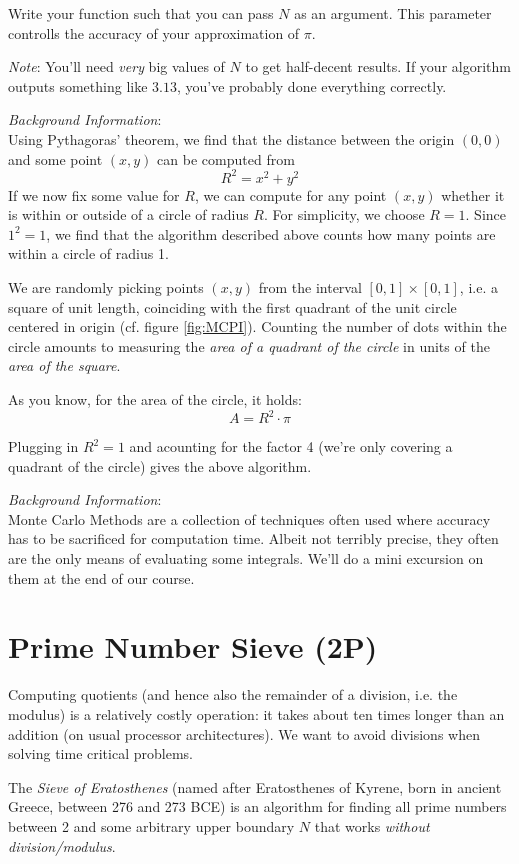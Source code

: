 \documentclass[
	english,
	fontsize=10pt,
	parskip=half,
	titlepage=true,
	DIV=12
]{scrartcl}
\newcommand*{\ie}{i.\;e. }
\begin{document}
Write your function such that you can pass $N$ as an argument. This parameter controlls the accuracy of your approximation of $\pi$.

\emph{Note}: You'll need \emph{very} big values of $N$ to get half-decent results. If your algorithm outputs something like $3.13$, you've probably done everything correctly.

\emph{Background Information}:\\
Using Pythagoras' theorem, we find that the distance between the origin $(0, 0)$ and some point $(x, y)$ can be computed from
\[ R^2 = x^2 + y^2 \]
If we now fix some value for $R$, we can compute for any point $(x, y)$ whether it is within or outside of a circle of radius $R$. For simplicity, we choose $R = 1$. Since $1^2 = 1$, we find that the algorithm described above counts how many points are within a circle of radius 1.

We are randomly picking points $(x, y)$ from the interval $[0, 1] \times [0, 1]$, \ie a square of unit length, coinciding with the first quadrant of the unit circle centered in origin (cf. figure \ref{fig:MCPI}). Counting the number of dots within the circle amounts to measuring the \emph{area of a quadrant of the circle} in units of the \emph{area of the square}.

As you know, for the area of the circle, it holds:
\[ A = R^2 \cdot \pi \]

Plugging in $R^2 = 1$ and acounting for the factor 4 (we're only covering a quadrant of the circle) gives the above algorithm.

\emph{Background Information}:\\
Monte Carlo Methods are a collection of techniques often used where accuracy has to be sacrificed for computation time. Albeit not terribly precise, they often are the only means of evaluating some integrals. We'll do a mini excursion on them at the end of our course.


\section{Prime Number Sieve (2\;P)}
Computing quotients (and hence also the remainder of a division, \ie the modulus) is a relatively costly operation: it takes about ten times longer than an addition (on usual processor architectures). We want to avoid divisions when solving time critical problems.

The \emph{Sieve of Eratosthenes} (named after Eratosthenes of Kyrene, born in ancient Greece, between 276 and 273 BCE) is an algorithm for finding all prime numbers between 2 and some arbitrary upper boundary $N$ that works \emph{without division/modulus}.
\end{document}
